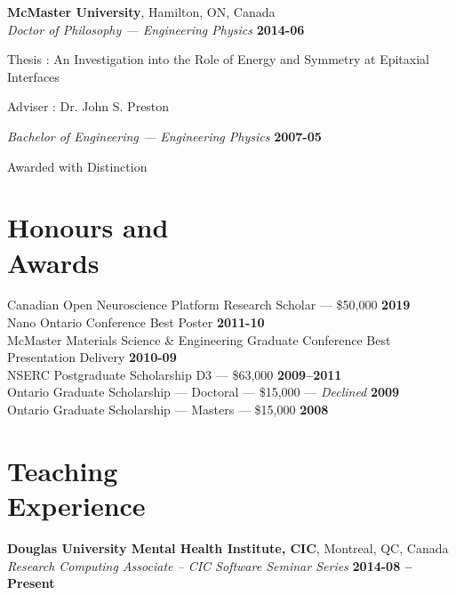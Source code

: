 \documentclass[margin1,line,canadian]{resume}
\begin{document}
\begin{resume}
 \textbf{McMaster University}, Hamilton, ON, Canada\\\vspace{2mm}%
 \textsl{Doctor of Philosophy --- Engineering Physics} \hfill \textbf{2014-06}\vspace{-3mm}\\\vspace{-1mm}%
 \begin{list2}
  \item Thesis : An Investigation into the Role of Energy and Symmetry at Epitaxial Interfaces
  \item Adviser : Dr. John S. Preston
 \end{list2}\vspace{-1.5mm}
 \textsl{Bachelor of Engineering --- Engineering Physics} \hfill \textbf{2007-05}\vspace{-3mm}\\\vspace{-1mm}
 \begin{list2}
  \item Awarded with Distinction
 \end{list2}

 \section{\mysidestyle Honours and\\Awards}
 Canadian Open Neuroscience Platform Research Scholar --- \$50,000 \hfill \textbf{2019}\\
 Nano Ontario Conference Best Poster \hfill \textbf{2011-10}\\%
 McMaster Materials Science \& Engineering Graduate Conference Best Presentation Delivery \hfill \textbf{2010-09}\\%
 NSERC Postgraduate Scholarship D3 --- \$63,000 \hfill \textbf{2009--2011}\\%
 Ontario Graduate Scholarship --- Doctoral --- \$15,000 --- \textsl{Declined} \hfill \textbf{2009} \\%
 Ontario Graduate Scholarship --- Masters --- \$15,000 \hfill \textbf{2008}\\

 \section{\mysidestyle Teaching\\Experience}
 \textbf{Douglas University Mental Health Institute, CIC}, Montreal, QC, Canada \\%
 \textsl{Research Computing Associate -- CIC Software Seminar Series} \hfill \textbf{2014-08 -- Present}


\end{resume}
\end{document}
